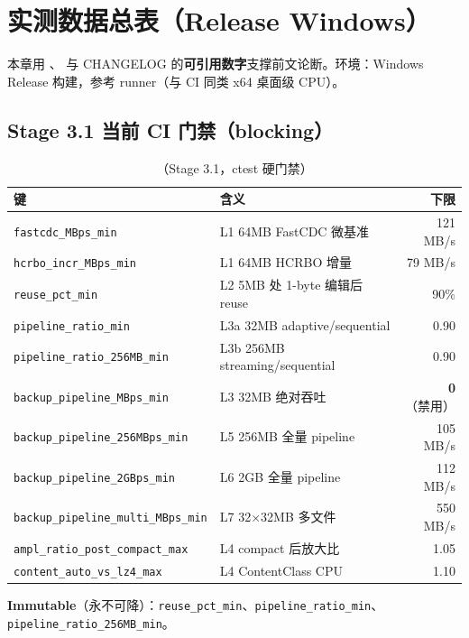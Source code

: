 \chapter{实测数据总表（Release Windows）}
\label{ch:measured-data}

本章用 、 与 CHANGELOG  的\textbf{可引用数字}支撑前文论断。环境：Windows Release 构建，参考 runner（与 CI 同类 x64 桌面级 CPU）。

\section{Stage 3.1 当前 CI 门禁（blocking）}

\begin{table}[htbp]
\centering
\caption{（Stage 3.1，ctest 硬门禁）}
\begin{tabular}{@{}llr@{}}
\toprule
键 & 含义 & 下限 \\
\midrule
\texttt{fastcdc\_MBps\_min} & L1 64MB FastCDC 微基准 & 121 MB/s \\
\texttt{hcrbo\_incr\_MBps\_min} & L1 64MB HCRBO 增量 & 79 MB/s \\
\texttt{reuse\_pct\_min} & L2 5MB 处 1-byte 编辑后 reuse & 90\% \\
\texttt{pipeline\_ratio\_min} & L3a 32MB adaptive/sequential & 0.90 \\
\texttt{pipeline\_ratio\_256MB\_min} & L3b 256MB streaming/sequential & 0.90 \\
\texttt{backup\_pipeline\_MBps\_min} & L3 32MB 绝对吞吐 & \textbf{0}（禁用） \\
\texttt{backup\_pipeline\_256MBps\_min} & L5 256MB 全量 pipeline & 105 MB/s \\
\texttt{backup\_pipeline\_2GBps\_min} & L6 2GB 全量 pipeline & 112 MB/s \\
\texttt{backup\_pipeline\_multi\_MBps\_min} & L7 32$\times$32MB 多文件 & 550 MB/s \\
\texttt{ampl\_ratio\_post\_compact\_max} & L4 compact 后放大比 & 1.05 \\
\texttt{content\_auto\_vs\_lz4\_max} & L4 ContentClass CPU & 1.10 \\
\bottomrule
\end{tabular}
\end{table}

\textbf{Immutable}（永不可降）：\texttt{reuse\_pct\_min}、\texttt{pipeline\_ratio\_min}、\texttt{pipeline\_ratio\_256MB\_min}。

